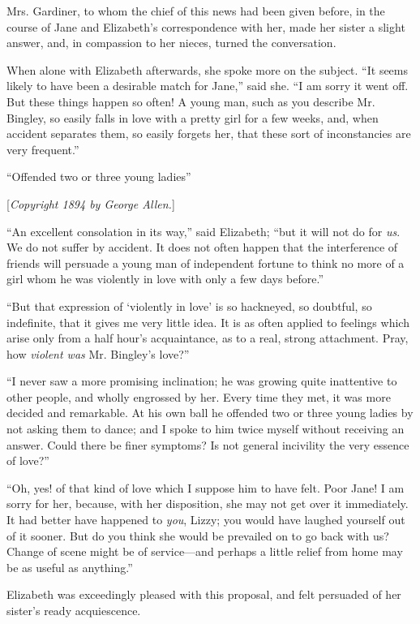 \documentclass[12pt,openright]{book}
\begin{document}
Mrs. Gardiner, to whom the chief of this news had been given before, in the course of Jane and Elizabeth’s correspondence with her, made her sister a slight answer, and, in compassion to her nieces, turned the conversation.

When alone with Elizabeth afterwards, she spoke more on the subject. “It seems likely to have been a desirable match for Jane,” said she. “I am sorry it went off. But these things happen so often! A young man, such as you describe Mr. Bingley, so easily falls in love with a pretty girl for a few weeks, and, when accident separates them, so easily forgets her, that these sort of inconstancies are very frequent.”

“Offended two or three young ladies”

[\textit{Copyright 1894 by George Allen.}]

“An excellent consolation in its way,” said Elizabeth; “but it will not do for \textit{us}. We do not suffer by accident. It does not often happen that the interference of friends will persuade a young man of independent fortune to think no more of a girl whom he was violently in love with only a few days before.”

“But that expression of ‘violently in love’ is so hackneyed, so doubtful, so indefinite, that it gives me very little idea. It is as often applied to feelings which arise only from a half hour’s acquaintance, as to a real, strong attachment. Pray, how \textit{violent was} Mr. Bingley’s love?”

“I never saw a more promising inclination; he was growing quite inattentive to other people, and wholly engrossed by her. Every time they met, it was more decided and remarkable. At his own ball he offended two or three young ladies by not asking them to dance; and I spoke to him twice myself without receiving an answer. Could there be finer symptoms? Is not general incivility the very essence of love?”

“Oh, yes! of that kind of love which I suppose him to have felt. Poor Jane! I am sorry for her, because, with her disposition, she may not get over it immediately. It had better have happened to \textit{you}, Lizzy; you would have laughed yourself out of it sooner. But do you think she would be prevailed on to go back with us? Change of scene might be of service—and perhaps a little relief from home may be as useful as anything.”

Elizabeth was exceedingly pleased with this proposal, and felt persuaded of her sister’s ready acquiescence.
\end{document}
